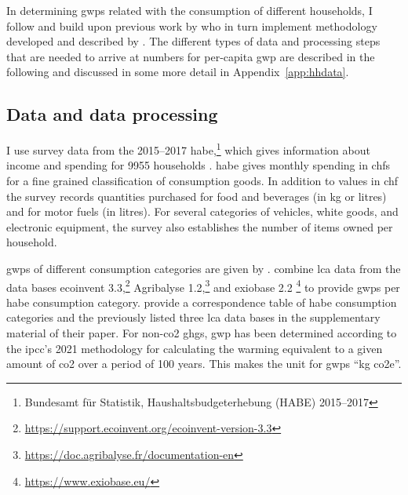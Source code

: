 \documentclass[referee, lineno, pdflatex,sn-apa]{sn-jnl}%
\theoremstyle{thmstyleone}%
\theoremstyle{thmstyletwo}%
\theoremstyle{thmstylethree}%
\begin{document}
In determining \acp{gwp} related with the consumption of different households, I follow and build upon previous work by \citet{jakobs_nfp73_2023}  who in turn implement methodology developed and described by \citet{froemelt_using_2018}.
The different types of data and processing steps that are needed to arrive at numbers for per-capita \ac{gwp} are described in the following and discussed in some more detail in Appendix~\ref{app:hhdata}.

\subsection*{Data and data processing}
I use survey data from the 2015--2017 \ac{habe},\footnote{%
  Bundesamt für Statistik, Haushaltsbudgeterhebung (HABE) 2015--2017
} which gives information about income and spending for 9955 households \citep[see][for more information]{oetliker_haushaltsbudgeterhebung_2022}.
\ac{habe} gives monthly spending in \acp{chf} for a fine grained classification of consumption goods.
In addition to values in \ac{chf} the survey records quantities purchased for food and beverages (in kg or litres) and for motor fuels (in litres).
For several categories of vehicles,  white goods, and electronic equipment, the survey also establishes the number of items owned per household.

\acp{gwp} of different consumption categories are given by \citet{jakobs_nfp73_2023}.
\citeauthor{jakobs_nfp73_2023} combine \ac{lca} data from the data bases
ecoinvent 3.3,\footnote{\url{https://support.ecoinvent.org/ecoinvent-version-3.3}}
Agribalyse 1.2,\footnote{\url{https://doc.agribalyse.fr/documentation-en}} and
exiobase 2.2 \citep{wood_global_2015}\footnote{\url{https://www.exiobase.eu/}}
to provide \acp{gwp} per \ac{habe} consumption category.
\citet{froemelt_using_2018} provide a correspondence table of \ac{habe} consumption categories and the previously listed three \ac{lca} data bases in the supplementary material of their paper.
For non-\ac{co2} \aclp{ghg}, \ac{gwp} has been determined according to the \ac{ipcc}'s 2021 methodology for calculating the warming equivalent to a given amount of \ac{co2} over a period of 100 years.
This makes the unit for \acp{gwp} ``kg \ac{co2e}''.
\end{document}
